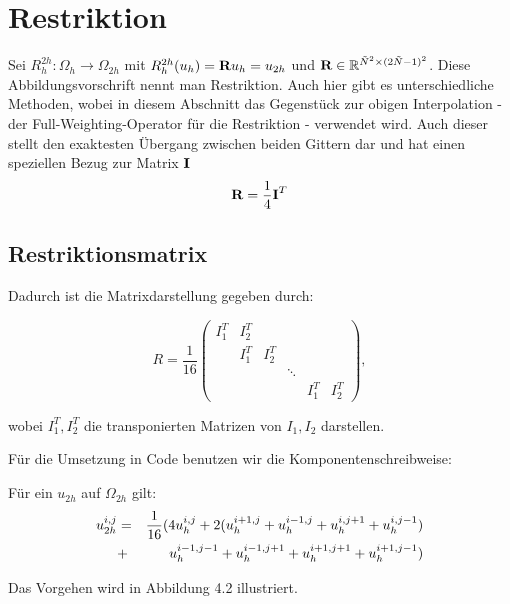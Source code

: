 \section{Restriktion}

Sei $R_{h}^{2h}: \Omega_{h} \longrightarrow \Omega_{2h}$ mit $R_{h}^{2h}(u_{h}) = {\textbf{R}}u_{h} = u_{2h}$ und ${\textbf{R}} \in \mathbb{R}^{\tilde N^{2} \times (2 \tilde N - 1)^{2}}$. Diese Abbildungsvorschrift nennt man Restriktion. Auch hier gibt es unterschiedliche Methoden, wobei in diesem Abschnitt das Gegenstück zur obigen Interpolation - der Full-Weighting-Operator für die Restriktion - verwendet wird. Auch dieser stellt den exaktesten Übergang zwischen beiden Gittern dar und hat einen speziellen Bezug zur Matrix ${\textbf{I}}$
\begin{equation}
{\textbf{R}} = \frac {1} {4} {\textbf{I}}^{T}
\end{equation}

\subsection{Restriktionsmatrix}

Dadurch ist die Matrixdarstellung gegeben durch:

\begin{equation}
R = \frac{1}{16}
\begin{pmatrix}
I_{1}^{T} & I_{2}^{T}\\
		  & I_{1}^{T} & I_{2}^{T}\\
		  &			  &			  & \ddots\\
		  &			  &			  &		   & I_{1}^{T} & I_{2}^{T}
\end{pmatrix},
\end{equation}

wobei $I_{1}^{T}, I_{2}^{T}$ die transponierten Matrizen von $I_{1}, I_{2}$ darstellen.

Für die Umsetzung in Code benutzen wir die Komponentenschreibweise:

Für ein $u_{2h}$ auf $\Omega_{2h}$ gilt:
\begin{eqnarray}
u_{2h}^{i,j} &=& \frac {1} {16} (4u_{h}^{i,j}+2(u_{h}^{i+1,j}+u_{h}^{i-1,j}+u_{h}^{i,j+1}+u_{h}^{i,j-1})\notag \\
&+& u_{h}^{i-1,j-1}+u_{h}^{i-1,j+1}+u_{h}^{i+1,j+1}+u_{h}^{i+1,j-1})
\end{eqnarray}

Das Vorgehen wird in Abbildung 4.2 illustriert.

 \label{img.restriction}

